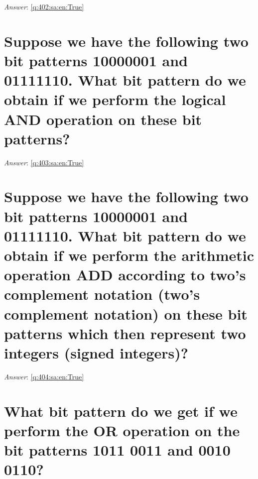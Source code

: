 \documentclass[a4paper,11pt,oneside]{book}
\begin{document}
\begin{sloppypar}
\vspace{2cm}

\noindent\makebox[\textwidth]{\hrulefill}

\vspace{1cm}

\textit{Answer}: \autoref{q:402:sa:en:True}



\section{Suppose we have the following two bit patterns 10000001 and 01111110. What bit pattern do we obtain if we perform the logical AND operation on these bit patterns?}

\label{q:403:sa:en:False}

\vspace{2cm}

\noindent\makebox[\textwidth]{\hrulefill}

\vspace{1cm}

\textit{Answer}: \autoref{q:403:sa:en:True}



\section{Suppose we have the following two bit patterns 10000001 and 01111110. What bit pattern do we obtain if we perform the arithmetic operation ADD according to two's complement notation (two's complement notation) on these bit patterns which then represent two integers (signed integers)?}

\label{q:404:sa:en:False}

\vspace{2cm}

\noindent\makebox[\textwidth]{\hrulefill}

\vspace{1cm}

\textit{Answer}: \autoref{q:404:sa:en:True}



\section{What bit pattern do we get if we perform the OR operation on the bit patterns 1011 0011 and 0010 0110?}

\label{q:405:sa:en:False}

\vspace{2cm}


\end{sloppypar}
\end{document}
